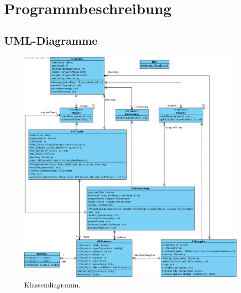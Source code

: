 \chapter{Programmbeschreibung}\label{ch:programmbeschreibung}

\section{UML-Diagramme}\label{sec:uml}

\begin{figure}[htb]
    \centering
    \includegraphics[width=\linewidth]{images/ClassDiagram1}
    \caption{
        Klassendiagramm.
    }
    \label{fig:klassen-dia}
\end{figure}

